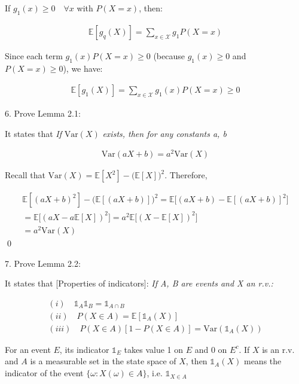 \documentclass[10pt]{article}
\begin{document}
If $g_1(x) \geq 0 \quad\forall x$ with $P(X = x)$, then: 

\begin{gather*}
    \mathbb{E}[g_q(X)] = \sum_{x \in \mathcal{X}}g_1 P(X = x)
\end{gather*}

Since each term $g_1(x)P(X = x) \geq 0$ (because $g_1(x) \geq 0$ and $P(X = x) \geq 0$), we have:

\begin{gather*}
    \mathbb{E}[g_1(X)] = \sum_{x \in \mathcal{X}} g_1(x) P(X = x) \geq 0
\end{gather*}

\newpage

6. Prove Lemma 2.1:

It states that \textit{If }$\text{Var}(X)$\textit{ exists, then for any constants a, b}

\begin{gather*}
    \text{Var}(aX + b) = a^2\text{Var}(X)
\end{gather*}

Recall that $\text{Var}(X) = \mathbb{E}[X^2] - \big(\mathbb{E}[X]\big)^2$. Therefore, 

\begin{gather*}
    \mathbb{E}[(aX+b)^2] - \big(\mathbb{E}[(aX+b)]\big)^2 = \mathbb{E}\big[(aX+b) - \mathbb{E}[(aX+b)]^2\big] \\
    = \mathbb{E}\big[(aX - a\mathbb{E}[X])^2\big] = a^2\mathbb{E}\big[(X - \mathbb{E}[X])^2\big] \\ 
    = a^2\text{Var}(X)
\end{gather*}
\qed

7. Prove Lemma 2.2: 

It states that [Properties of indicators]: \textit{If A, B are events and X an r.v.:}

\begin{gather*}
    (i)\quad\mathbb{1}_A\mathbb{1}_B = \mathbb{1}_{A\cap B}\\
    (ii)\quad P(X \in A) = \mathbb{E}[\mathbb{1}_A(X)]\\
    (iii)\quad P(X \in A)[1 - P(X \in A)] = \text{Var}(\mathbb{1}_A(X))
\end{gather*}

For an event $E$, its indicator $\mathbb{1}_E$ takes value 1 on $E$ and 0 on $E^c$. If $X$ is an r.v. and $A$ is a measurable set 
in the state space of $X$, then $\mathbb{1}_A(X)$ means the indicator of the event $\{\omega: X(\omega) \in A\}$, i.e. $\mathbb{1}_{X \in A}$
\end{document}
